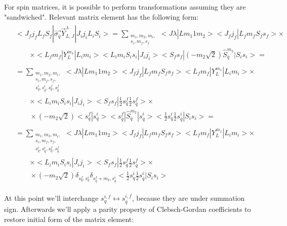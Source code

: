 For spin matrices, it is possible to perform transformations assuming they are "sandwiched". Relevant matrix element has the following form:
\begin{align}
    \begin{split}
        &<J_f j_f L_f S_f| \vec{\sigma_{\overline{q}}} \vec{Y}_{L, J}^\lambda |J_i j_i L_i S_i> = \sum_{\substack{m_1, m_2, m_i,\\ s_i, m_f, s_f}} <J \lambda| L m_1 1 m_2> <J_f j_f| L_f m_f S_f s_f> \times\\
        &\qquad\times <L_f m_f| Y_{L}^{m_1} |L_i m_i>  <L_i m_i S_i s_i| J_i j_i> <S_f s_f| (-m_2\sqrt{2}) \hat{S}_{\overline{q}}^{m_2} |S_i s_i> =
    \end{split} \\
    \begin{split}
        &= \sum_{\substack{m_1, m_2, m_i,\\ s_i, m_f, s_f,\\ s^i_{q}, s^{i}_{\overline{q}}, s^{f}_{q}, s^{f}_{\overline{q}}}} <J \lambda| L m_1 1 m_2> <J_f j_f| L_f m_f S_f s_f> <L_f m_f| Y_{L}^{m_1} |L_i m_i> \times \\
        &\qquad\times <L_i m_i S_i s_i| J_i j_i> <S_f s_f| \frac{1}{2} s^f_{q} \frac{1}{2} s^f_{\overline{q}}> \times \\
        &\qquad\times (-m_2\sqrt{2}) <s^f_{q}|s^{i}_{q}> <s^f_{\overline{q}}| \hat{S}_{\overline{q}}^{m_2} |s^i_{\overline{q}}> <\frac{1}{2} s^i_{q} \frac{1}{2} s^i_{\overline{q}} |S_i s_i> =
    \end{split} \\
    \begin{split}
        &= \sum_{\substack{m_1, m_2, m_i,\\ s_i, m_f, s_f,\\ s^i_{q}, s^{i}_{\overline{q}}, s^{f}_{q}, s^{f}_{\overline{q}}}} <J \lambda| L m_1 1 m_2> <J_f j_f| L_f m_f S_f s_f> <L_f m_f| Y_{L}^{m_1} |L_i m_i> \times \\
        &\qquad\times <L_i m_i S_i s_i| J_i j_i> <S_f s_f| \frac{1}{2} s^f_{q} \frac{1}{2} s^f_{\overline{q}}> \times \\
        &\qquad\times (-m_2\sqrt{2}) \delta_{s^f_{q}, s^{i}_{q}} \delta_{s^f_{\overline{q}} + m_2, s^i_{\overline{q}}} <\frac{1}{2} s^i_{q} \frac{1}{2} s^i_{\overline{q}} |S_i s_i>
    \end{split}
\end{align}

At this point we'll interchange $s^{i,f}_{q} \leftrightarrow s^{i,f}_{\overline{q}}$, because they are under summation sign. Afterwards we'll apply a parity property of Clebsch-Gordan coefficients to restore initial form of the matrix element:

